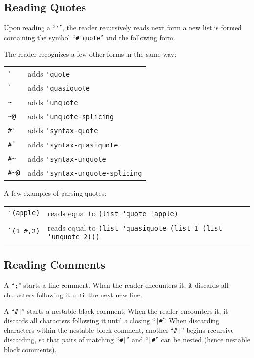 \subsection{Reading Quotes}
\label{subsec:aml-base-lang-reader-quotes}

Upon reading a ``\lstinline!'!'', the reader recursively reads next form a new list is formed containing the symbol ``\lstinline!#'quote!'' and the following form. 

The reader recognizes a few other forms in the same way:

\begin{tabular}{ l l }
  \lstinline!'! & adds \lstinline!'quote! \\
  \lstinline!`! & adds \lstinline!'quasiquote! \\
  \lstinline!~! & adds \lstinline!'unquote! \\
  \lstinline!~@! & adds \lstinline!'unquote-splicing! \\
  \lstinline!#'! & adds \lstinline!'syntax-quote! \\
  \lstinline!#`! & adds \lstinline!'syntax-quasiquote! \\
  \lstinline!#~! & adds \lstinline!'syntax-unquote! \\
  \lstinline!#~@! & adds \lstinline!'syntax-unquote-splicing! \\
\end{tabular}

\example A few examples of parsing quotes:

\begin{tabular}{ r l }
  \lstinline!'(apple)! & reads equal to \lstinline!(list 'quote 'apple)! \\
  \lstinline!`(1 #,2)! & reads equal to \lstinline!(list 'quasiquote (list 1 (list 'unquote 2)))! \\
\end{tabular}





\subsection{Reading Comments}
\label{subsec:aml-base-lang-reader-comments}

A ``\lstinline!;!'' starts a line comment. When the reader encounters it, it discards all characters following it until the next new line. 

A ``\lstinline!#|!'' starts a nestable block comment. When the reader encounters it, it discards all characters following it until a closing   ``\lstinline!|#!''. When discarding characters within the nestable block comment, another ``\lstinline!#|!'' begins recursive discarding, so that pairs of matching ``\lstinline!#|!'' and ``\lstinline!|#!'' can be nested (hence nestable block comments). 

